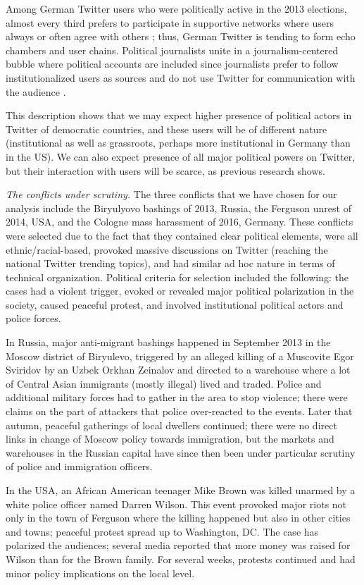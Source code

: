 Among German Twitter users who were politically active in the 2013 elections, almost every third prefers to participate in supportive networks where users always or often agree with others \cite{VaccariValerianiBarbera2016}; thus, German Twitter is tending to form echo chambers and user chains. Political journalists unite in a journalism-centered bubble where political accounts are included since journalists prefer to follow institutionalized users as sources and do not use Twitter for communication with the audience \cite{Nuernbergk}.

This description shows that we may expect higher presence of political actors in Twitter of democratic countries, and these users will be of different nature (institutional as well as grassroots, perhaps more institutional in Germany than in the US). We can also expect presence of all major political powers on Twitter, but their interaction with users will be scarce, as previous research shows.

\textit{The conflicts under scrutiny.} The three conflicts that we have chosen for our analysis include the Biryulyovo bashings of 2013, Russia, the Ferguson unrest of 2014, USA, and the Cologne mass harassment of 2016, Germany. These conflicts were selected due to the fact that they contained clear political elements, were all ethnic/racial-based, provoked massive discussions on Twitter (reaching the national Twitter trending topics), and had similar ad hoc nature in terms of technical organization. Political criteria for selection included the following: the cases had a violent trigger, evoked or revealed major political polarization in the society, caused peaceful protest, and involved institutional political actors and police forces.

In Russia, major anti-migrant bashings happened in September 2013 in the Moscow district of Biryulevo, triggered by an alleged killing of a Muscovite Egor Sviridov by an Uzbek Orkhan Zeinalov and directed to a warehouse where a lot of Central Asian immigrants (mostly illegal) lived and traded. Police and additional military forces had to gather in the area to stop violence; there were claims on the part of attackers that police over-reacted to the events. Later that autumn, peaceful gatherings of local dwellers continued; there were no direct links in change of Moscow policy towards immigration, but the markets and warehouses in the Russian capital have since then been under particular scrutiny of police and immigration officers.

In the USA, an African American teenager Mike Brown was killed unarmed by a white police officer named Darren Wilson. This event provoked major riots not only in the town of Ferguson where the killing happened but also in other cities and towns; peaceful protest spread up to Washington, DC. The case has polarized the audiences; several media reported that more money was raised for Wilson than for the Brown family. For several weeks, protests continued and had minor policy implications on the local level.

